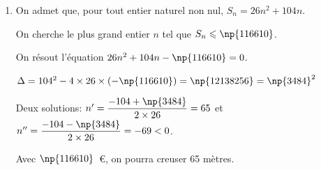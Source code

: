 \begin{enumerate}
\item On admet que, pour tout entier naturel non nul, $S_n=26n^2 +104n$. 

On cherche le plus grand entier $n$ tel que $S_n \leqslant \np{116610}$.

On résout l'équation $26n^2 + 104n - \np{116610}=0$.

$\Delta = 104^2 - 4 \times 26 \times (-\np{116610}) = \np{12138256} = \np{3484}^2$ 

Deux solutions: $n'=\dfrac{-104+\np{3484}}{2\times 26}=65$ et $n''=\dfrac{-104-\np{3484}}{2\times 26}=-69<0$.

Avec $\np{116610}$~\euro{}, on pourra creuser 65 mètres.

\end{enumerate}

\vspace{0.5cm}
